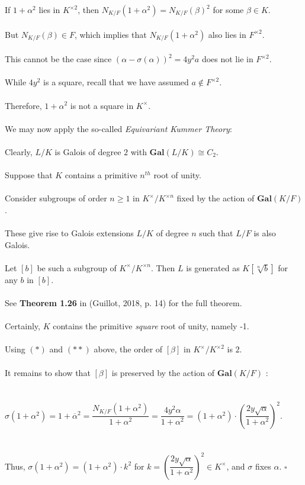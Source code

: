 \documentclass{article}
\begin{document}
If $1 + \alpha^2$ lies in $K^{\times2}$, then $N_{K/F}(1 + \alpha^2) = N_{K/F}(\beta)^2$ for some $\beta \in K$. \\\\
But $N_{K/F}(\beta) \in F$, which implies that $N_{K/F}(1 + \alpha^2)$ also lies in $F^{\times2}$. \\\\
This cannot be the case since $(\alpha - \sigma(\alpha))^2 = 4y^2a$  does not lie in $F^{\times2}$. \\\\
\indent While $4y^2$ is a square, recall that we have assumed $a \notin F^{\times2}$. \\\\
Therefore, $1 + \alpha^2$ is not a square in $K^{\times}$. \\\\
We may now apply the so-called \emph{Equivariant Kummer Theory}: \\\\
\indent Clearly, $L/K$ is Galois of degree $2$ with $\textbf{Gal}(L/K) \cong C_2$. \\\\
\indent Suppose that $K$ contains a primitive $n^{th}$ root of unity. \\\\
\indent Consider subgroups of order $n \geq 1$ in $K^\times/K^{\times n}$ fixed by the action of $\textbf{Gal}(K/F)$. \\\\
\indent These give rise to Galois extensions $L/K$ of degree $n$ such that $L/F$ is also Galois. \\\\
\indent Let $[b]$ be such a subgroup of $K^\times/K^{\times n}$. Then $L$ is generated as $K[\sqrt[n]{b}]$ for any $b$ in $[b]$.  \\\\
\indent See \textbf{Theorem 1.26} in (Guillot, 2018, p. 14) for the full theorem. \\\\
Certainly, $K$ contains the primitive \emph{square} root of unity, namely -1. \\\\
Using $(\ast)$ and $(\ast\ast)$ above, the order of $[\beta]$ in $K^\times/K^{\times2}$ is $2$. \\\\
It remains to show that $[\beta]$ is preserved by the action of $\textbf{Gal}(K/F)$ : \\\\\\
\indent $\sigma(1 + \alpha^2) = 1 + \overline{\alpha}^2 = \dfrac{N_{K/F}(1 + \alpha^2)}{1 + \alpha^2} = \dfrac{4y^2\alpha}{1 + \alpha^2} = (1 + \alpha^2) \cdot \left(\dfrac{2y\sqrt{\alpha}}{1 + \alpha^2}\right)^2$. \\\\\\
Thus, $\sigma(1 + \alpha^2) = (1 + \alpha^2) \cdot k^2$ for $k = \left(\dfrac{2y\sqrt{\alpha}}{1 + \alpha^2}\right)^2 \in K^\times$, and $\sigma$ fixes $\alpha$. $\square$ \\\\
\\
\end{document}
